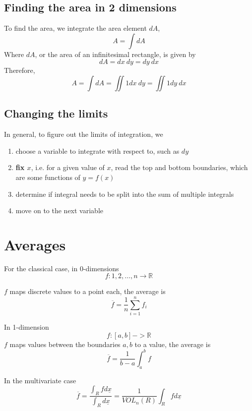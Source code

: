 \subsection{Finding the area in 2 dimensions}
To find the area, we integrate the area element $dA$, 
\[
  A = \int dA
\] 
Where $dA$, or the area of an infinitesimal rectangle, is given by
 \[
  dA = dx\ dy = dy\ dx
\] 
Therefore, 
\[
  A = \int dA = \iint 1 dx\ dy = \iint 1 dy\ dx
\] 

\subsection{Changing the limits}
In general, to figure out the limits of integration, we
\begin{enumerate}
   \item choose a variable to integrate with respect to, such as $dy$
   \item \textbf{fix $x$}, i.e. for a given value of $x$, read the top and bottom boundaries, which are some functions of $y = f(x)$ \\
   \item determine if integral needs to be split into the sum of multiple integrals 
   \item move on to the next variable
\end{enumerate}


\section{Averages}

For the classical case, in 0-dimensions
\[
   f: {1, 2, \hdots , n} \rightarrow \mathbb{R}
\] 

$f$ maps discrete values to a point each, the average is
\[
   \overline{f} = \frac{1}{n} \sum \limits_{i=1}^{n} f_i
\] 

In 1-dimension
\[
  f: [a,b] -> \mathbb{R} 
\] 
$f$ maps values between the boundaries $a, b$ to a value, the average is \[
   \overline{f} = \frac{1}{b-a} \int_{a}^{b}  f 
\] 

In the multivariate case
\[
   \overline{f} = \frac{ \int_{R}^{} f d \underline{x} }{ \int_{R}^{} d \underline{x}  } = \frac{1}{VOL_n (R)} \int_{R}^{} f d \underline{x} 
\] 

